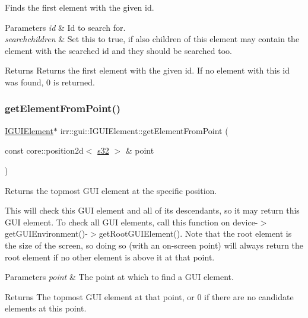 Finds the first element with the given id. 


\begin{DoxyParams}{Parameters}
{\em id} & Id to search for. \\
\hline
{\em searchchildren} & Set this to true, if also children of this element may contain the element with the searched id and they should be searched too. \\
\hline
\end{DoxyParams}
\begin{DoxyReturn}{Returns}
Returns the first element with the given id. If no element with this id was found, 0 is returned. 
\end{DoxyReturn}
\mbox{\label{classirr_1_1gui_1_1IGUIElement_ae49f8a5228ce0c18e0c98becf74ee56a}} 
\subsubsection{\texorpdfstring{get\+Element\+From\+Point()}{getElementFromPoint()}}
{\footnotesize\ttfamily \hyperlink{classirr_1_1gui_1_1IGUIElement}{I\+G\+U\+I\+Element}$\ast$ irr\+::gui\+::\+I\+G\+U\+I\+Element\+::get\+Element\+From\+Point (\begin{DoxyParamCaption}\item[{const core\+::position2d$<$ \hyperlink{namespaceirr_ac66849b7a6ed16e30ebede579f9b47c6}{s32} $>$ \&}]{point }\end{DoxyParamCaption})\hspace{0.3cm}{\ttfamily [inline]}}



Returns the topmost G\+UI element at the specific position. 

This will check this G\+UI element and all of its descendants, so it may return this G\+UI element. To check all G\+UI elements, call this function on device-\/$>$get\+G\+U\+I\+Environment()-\/$>$get\+Root\+G\+U\+I\+Element(). Note that the root element is the size of the screen, so doing so (with an on-\/screen point) will always return the root element if no other element is above it at that point. 
\begin{DoxyParams}{Parameters}
{\em point} & The point at which to find a G\+UI element. \\
\hline
\end{DoxyParams}
\begin{DoxyReturn}{Returns}
The topmost G\+UI element at that point, or 0 if there are no candidate elements at this point. 
\end{DoxyReturn}
\mbox{\label{classirr_1_1gui_1_1IGUIElement_a308fa8bc16580d53df5c65ded0c1349b}} 
